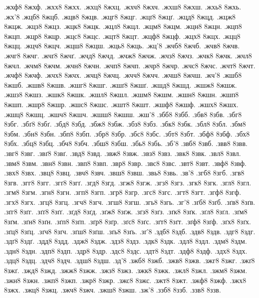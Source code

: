 {.жхф8
8жхф.
.жхх8
8жхх.
.жхц8
8жхц.
.жхч8
8жхч.
.жхш8
8жхш.
.жхь8
8жхь.
.жх'8
.жцб8
8жцб.
.жцв8
8жцв.
.жцг8
8жцг.
.жцґ8
8жцґ.
.жцд8
8жцд.
.жцж8
8жцж.
.жцз8
8жцз.
.жцк8
8жцк.
.жцл8
8жцл.
.жцм8
8жцм.
.жцн8
8жцн.
.жцп8
8жцп.
.жцр8
8жцр.
.жцс8
8жцс.
.жцт8
8жцт.
.жцф8
8жцф.
.жцх8
8жцх.
.жцц8
8жцц.
.жцч8
8жцч.
.жцш8
8жцш.
.жць8
8жць.
.жц'8
.жчб8
8жчб.
.жчв8
8жчв.
.жчг8
8жчг.
.жчґ8
8жчґ.
.жчд8
8жчд.
.жчж8
8жчж.
.жчз8
8жчз.
.жчк8
8жчк.
.жчл8
8жчл.
.жчм8
8жчм.
.жчн8
8жчн.
.жчп8
8жчп.
.жчр8
8жчр.
.жчс8
8жчс.
.жчт8
8жчт.
.жчф8
8жчф.
.жчх8
8жчх.
.жчц8
8жчц.
.жчч8
8жчч.
.жчш8
8жчш.
.жч'8
.жшб8
8жшб.
.жшв8
8жшв.
.жшг8
8жшг.
.жшґ8
8жшґ.
.жшд8
8жшд.
.жшж8
8жшж.
.жшз8
8жшз.
.жшк8
8жшк.
.жшл8
8жшл.
.жшм8
8жшм.
.жшн8
8жшн.
.жшп8
8жшп.
.жшр8
8жшр.
.жшс8
8жшс.
.жшт8
8жшт.
.жшф8
8жшф.
.жшх8
8жшх.
.жшц8
8жшц.
.жшч8
8жшч.
.жшш8
8жшш.
.жш'8
.збб8
8збб.
.збв8
8збв.
.збг8
8збг.
.збґ8
8збґ.
.збд8
8збд.
.збж8
8збж.
.збз8
8збз.
.збк8
8збк.
.збл8
8збл.
.збм8
8збм.
.збн8
8збн.
.збп8
8збп.
.збр8
8збр.
.збс8
8збс.
.збт8
8збт.
.збф8
8збф.
.збх8
8збх.
.збц8
8збц.
.збч8
8збч.
.збш8
8збш.
.збь8
8збь.
.зб'8
.звб8
8звб.
.звв8
8звв.
.звг8
8звг.
.звґ8
8звґ.
.звд8
8звд.
.звж8
8звж.
.звз8
8звз.
.звк8
8звк.
.звл8
8звл.
.звм8
8звм.
.звн8
8звн.
.звп8
8звп.
.звр8
8звр.
.звс8
8звс.
.звт8
8звт.
.звф8
8звф.
.звх8
8звх.
.звц8
8звц.
.звч8
8звч.
.звш8
8звш.
.звь8
8звь.
.зв'8
.згб8
8згб.
.згв8
8згв.
.згг8
8згг.
.згґ8
8згґ.
.згд8
8згд.
.згж8
8згж.
.згз8
8згз.
.згк8
8згк.
.згл8
8згл.
.згм8
8згм.
.згн8
8згн.
.згп8
8згп.
.згр8
8згр.
.згс8
8згс.
.згт8
8згт.
.згф8
8згф.
.згх8
8згх.
.згц8
8згц.
.згч8
8згч.
.згш8
8згш.
.згь8
8згь.
.зг'8
.зґб8
8зґб.
.зґв8
8зґв.
.зґг8
8зґг.
.зґґ8
8зґґ.
.зґд8
8зґд.
.зґж8
8зґж.
.зґз8
8зґз.
.зґк8
8зґк.
.зґл8
8зґл.
.зґм8
8зґм.
.зґн8
8зґн.
.зґп8
8зґп.
.зґр8
8зґр.
.зґс8
8зґс.
.зґт8
8зґт.
.зґф8
8зґф.
.зґх8
8зґх.
.зґц8
8зґц.
.зґч8
8зґч.
.зґш8
8зґш.
.зґь8
8зґь.
.зґ'8
.здб8
8здб.
.здв8
8здв.
.здг8
8здг.
.здґ8
8здґ.
.здд8
8здд.
.здж8
8здж.
.здз8
8здз.
.здк8
8здк.
.здл8
8здл.
.здм8
8здм.
.здн8
8здн.
.здп8
8здп.
.здр8
8здр.
.здс8
8здс.
.здт8
8здт.
.здф8
8здф.
.здх8
8здх.
.здц8
8здц.
.здч8
8здч.
.здш8
8здш.
.зд'8
.зжб8
8зжб.
.зжв8
8зжв.
.зжг8
8зжг.
.зжґ8
8зжґ.
.зжд8
8зжд.
.зжж8
8зжж.
.зжз8
8зжз.
.зжк8
8зжк.
.зжл8
8зжл.
.зжм8
8зжм.
.зжн8
8зжн.
.зжп8
8зжп.
.зжр8
8зжр.
.зжс8
8зжс.
.зжт8
8зжт.
.зжф8
8зжф.
.зжх8
8зжх.
.зжц8
8зжц.
.зжч8
8зжч.
.зжш8
8зжш.
.зж'8
.ззб8
8ззб.
.ззв8
8ззв.
}
